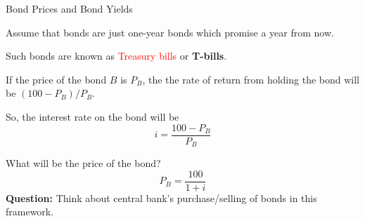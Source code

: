 \documentclass[shownotes,11pt, aspectratio=169]{beamer}
\newenvironment{wideitemize}{\itemize\addtolength{\itemsep}{10pt}}{\enditemize}
\begin{document}
\begin{frame}{Bond Prices and Bond Yields}
\begin{wideitemize}
\item Assume that bonds are just one-year bonds which promise  a year from now.
\item Such bonds are known as \textcolor{red}{Treasury bills} or \textbf{T-bills}.
\item If the price of the bond $B$ is $P_B$, the the rate of return from holding the bond will be $(100 - P_B)/P_B$.
\item So, the interest rate on the bond will be \pause
    \[ i = \frac{100 - P_B}{P_B} \]
\item What will be the price of the bond? \pause
    \[ P_B = \frac{100}{1 + i} \]
\end{wideitemize}
\pause
\textbf{Question:} Think about central bank's purchase/selling of bonds in this framework.
\end{frame}
\end{document}
